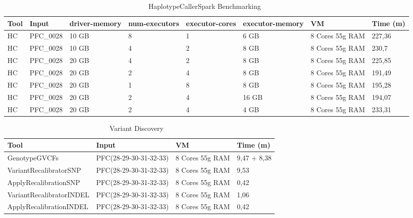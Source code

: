 \begin{table}[h]
	\caption{HaplotypeCallerSpark Benchmarking~\label{HC_bench}}
	\begin{center}
		\begin{tabular}{| m{5em} | m{5em} | m{3em} | m{4em} | m{4em} | m{5em} | m{4.5em} | m{3em} |}
    		\hline
    		Tool & Input & driver-memory & num-executors & executor-cores & executor-memory & VM & Time (m) \\ \hline
		    HC & PFC\_0028 & 10 GB & 8 & 1 & 6 GB & 8 Cores 55g RAM & 227,36 \\ \hline
			HC & PFC\_0028 & 10 GB & 4 & 2 & 8 GB & 8 Cores 55g RAM  & 230,7 \\ \hline
			HC & PFC\_0028 & 20 GB & 4 & 2 & 8 GB & 8 Cores 55g RAM  & 225,85 \\ \hline
			HC & PFC\_0028 & 20 GB & 2 & 4 & 8 GB & 8 Cores 55g RAM  & 191,49 \\ \hline
			HC & PFC\_0028 & 20 GB & 1 & 8 & 8 GB & 8 Cores 55g RAM  & 195,28 \\ \hline
			HC & PFC\_0028 & 20 GB & 2 & 4 & 16 GB & 8 Cores 55g RAM  & 194,07 \\ \hline
			HC & PFC\_0028 & 20 GB & 2 & 4 & 4 GB & 8 Cores 55g RAM  & 233,31 \\ \hline
            
    	\end{tabular}
    \end{center}
\end{table}


\begin{table}[h]
	\caption{Variant Discovery ~\label{vd}}
	\begin{center}
		\begin{tabular}{| m{12em} | m{11em} | m{8em} | m{5em} |}
    		\hline
    		Tool & Input & VM & Time (m) \\ \hline
		    GenotypeGVCFs & PFC(28-29-30-31-32-33) & 8 Cores 55g RAM & 9,47 + 8,38 \\ \hline
			VariantRecalibratorSNP & PFC(28-29-30-31-32-33) & 8 Cores 55g RAM  & 9,53 \\ \hline
			ApplyRecalibrationSNP & PFC(28-29-30-31-32-33) & 8 Cores 55g RAM  & 0,42 \\ \hline
			VariantRecalibratorINDEL & PFC(28-29-30-31-32-33) & 8 Cores 55g RAM  & 1,06 \\ \hline
			ApplyRecalibrationINDEL & PFC(28-29-30-31-32-33) & 8 Cores 55g RAM  & 0,42 \\ \hline
            
    	\end{tabular}
    \end{center}
\end{table}




